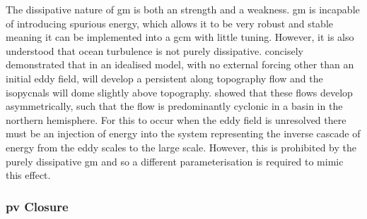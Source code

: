 \documentclass[10pt,a4paper]{report}
\begin{document}
        The dissipative nature of \gls{gm} is both an strength and a
         weakness. \gls{gm} is incapable of introducing spurious energy,
         which allows it to be very robust and stable meaning it can be implemented 
         into a \gls{gcm} with little tuning. However, it is also understood that
         ocean turbulence is not purely dissipative.
          \cite{adcock2000interactions} concisely demonstrated that
         in an idealised model, with no external forcing other
         than an initial eddy field, will develop a persistent along
         topography flow and the isopycnals will dome slightly above topography.
          \cite{nost2008asymmetry} showed that these
         flows develop asymmetrically, such that the flow is 
         predominantly cyclonic in
         a basin in the northern hemisphere. For this to occur 
         when the eddy field is unresolved there must be an 
         injection of energy into the system representing the 
         inverse cascade of energy from the eddy scales to the large scale.
         However, this is prohibited by the purely dissipative \gls{gm}
         and so a different parameterisation is required to mimic this
         effect.
         
         
         
         \subsubsection{\gls{pv} Closure}
         
\end{document}
